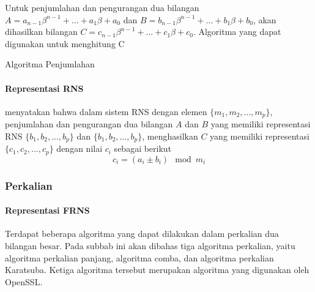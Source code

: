Untuk penjumlahan dan pengurangan dua bilangan $A = a_{n-1}\beta^{n-1}+...+a_{1}\beta+a_{0}$ dan $B = b_{n-1}\beta^{n-1}+...+b_{1}\beta+b_{0}$, akan dihasilkan bilangan $C = c_{n-1}\beta^{n-1}+...+c_{1}\beta+c_{0}$. Algoritma yang dapat digunakan untuk menghitung C

\begin{algorithm}
  \caption{Algoritma Penjumlahan}
    \label{alg:add}
  \begin{algorithmic}[1]
    \Statex
      \EndFor
      \State {}
    \EndFunction
  \end{algorithmic}
\end{algorithm}

\paragraph{Representasi RNS}

\citet{rns_sharoun} menyatakan bahwa dalam sistem RNS dengan elemen $\{m_1,m_2,...,m_p\}$, penjumlahan dan pengurangan dua bilangan $A$ dan $B$ yang memiliki representasi RNS $\{b_1,b_2,...,b_p\}$ dan $\{b_1,b_2,...,b_p\}$,  menghasilkan $C$ yang memiliki representasi $\{c_1,c_2,...,c_p\}$ dengan nilai $c_i$ sebagai berikut
\begin{equation}
    c_i = (a_i \pm b_i) \mod m_i
\end{equation}


\subsubsection{Perkalian} \label{sec:mul_theory}

\paragraph{Representasi FRNS}
Terdapat beberapa algoritma yang dapat dilakukan dalam perkalian dua bilangan besar. Pada subbab ini akan dibahas tiga algoritma perkalian, yaitu algoritma perkalian panjang, algoritma comba, dan algoritma perkalian Karatsuba. Ketiga algoritma tersebut merupakan algoritma yang digunakan oleh OpenSSL.

